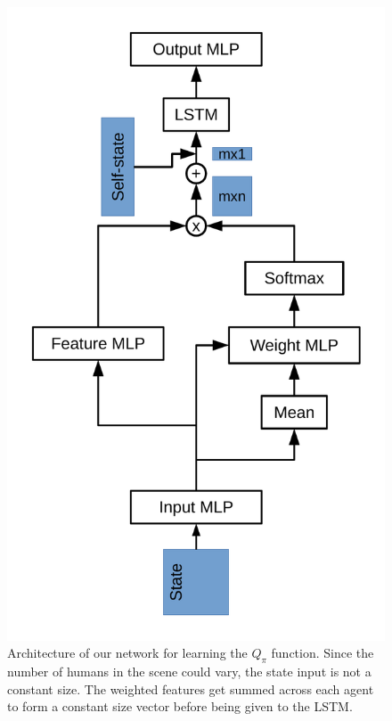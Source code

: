 \documentclass[letterpaper]{article}
\begin{document}
				\begin{figure}
					\centering
					\includegraphics[height=\linewidth, angle=270, origin=c]{model_arch}
					\caption{Architecture of our network for learning the $Q_\pi$ function. Since the number of humans in the scene could vary, the state input is not a constant size. The weighted features get summed across each agent to form a constant size vector before being given to the LSTM.}
					\label{fig:model_arch}
				\end{figure}
\end{document}
